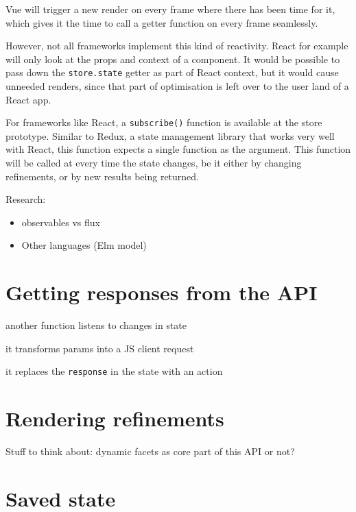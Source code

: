 Vue will trigger a new render on every frame where there has been time for it, which gives it the time to call a getter function on every frame seamlessly. 

However, not all frameworks implement this kind of reactivity. React for example will only look at the props and context of a component. It would be possible to pass down the {\tt store.state} getter as part of React context, but it would cause unneeded renders, since that part of optimisation is left over to the user land of a React app. 

For frameworks like React, a {\tt subscribe()} function is available at the store prototype. Similar to Redux\cite{redux-github}, a state management library that works very well with React, this function expects a single function as the argument. This function will be called at every time the state changes, be it either by changing refinements, or by new results being returned.

Research:

\begin{itemize}
  \item observables vs flux
  \item Other languages (Elm model)\cite{csstricks-elm} %
\end{itemize}


\section{Getting responses from the API} %
\label{sec:getting_responses_from_the_api}

another function listens to changes in state %

it transforms params into a JS client request

it replaces the {\tt response} in the state with an action


\section{Rendering refinements} %
\label{sec:rendering_refinements}

Stuff to think about: dynamic facets as core part of this API or not? %


\section{Saved state} %
\label{sec:saved_state}

